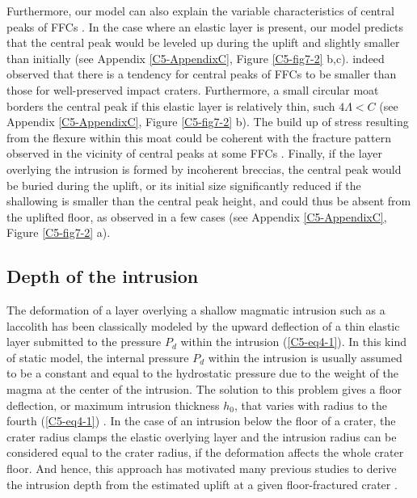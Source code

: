 Furthermore, our  model can also explain  the variable characteristics
of central peaks of FFCs \citep{Schultz:1976kt}.  In the case where an
elastic layer  is present,  our model predicts  that the  central peak
would  be leveled  up  during  the uplift  and  slightly smaller  than
initially  (see  Appendix \ref{C5-AppendixC},  Figure  \ref{C5-fig7-2}
b,c).  \citet{Schultz:1976kt} indeed observed that there is a tendency
for central peaks of FFCs to  be smaller than those for well-preserved
impact  craters.   Furthermore,  a  small circular  moat  borders  the
central  peak  if   this  elastic  layer  is   relatively  thin,  such
$4\Lambda<C$ (see Appendix  \ref{C5-AppendixC}, Figure \ref{C5-fig7-2}
b). The build up of stress resulting from the flexure within this moat
could be coherent  with the fracture pattern observed  in the vicinity
of central peaks at some FFCs \citep{Schultz:1976kt}.  Finally, if the
layer overlying  the intrusion is  formed by incoherent  breccias, the
central peak  would be buried during  the uplift, or its  initial size
significantly reduced  if the shallowing  is smaller than  the central
peak height,  and could  thus be  absent from  the uplifted  floor, as
observed  in   a  few   cases  \citep{Schultz:1976kt}   (see  Appendix
\ref{C5-AppendixC}, Figure \ref{C5-fig7-2} a).
		 
\subsection{Depth of the intrusion}
		
The deformation of a layer overlying a shallow magmatic intrusion such
as a laccolith  has been classically modeled by  the upward deflection
of a thin  elastic layer submitted to the pressure  $P_{d}$ within the
intrusion  (\ref{C5-eq4-1}).   In  this  kind  of  static  model,  the
internal pressure $P_{d}$  within the intrusion is  usually assumed to
be a constant and equal to  the hydrostatic pressure due to the weight
of the  magma at the  center of the  intrusion.  The solution  to this
problem  gives  a floor  deflection,  or  maximum intrusion  thickness
$h_0$,  that  varies  with   radius  to  the  fourth  (\ref{C5-eq4-1})
\citep{Johnson:1973ho,Pollard:1973ho}.   In the  case of  an intrusion
below the  floor of  a crater,  the crater  radius clamps  the elastic
overlying layer  and the intrusion  radius can be considered  equal to
the  crater  radius,  if  the deformation  affects  the  whole  crater
floor. And hence, this approach has motivated many previous studies to
derive  the intrusion  depth  from  the estimated  uplift  at a  given
floor-fractured crater \citep{Wichman:1996bj,Jozwiak:2012dq}.
		
